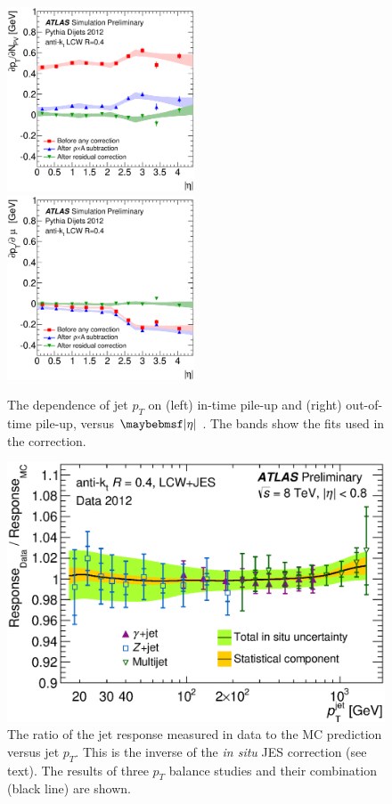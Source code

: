 \begin{figure}
	\includegraphics[width=0.495\textwidth]{tex/selection/jet_pu_npv}
	\hfill
	\includegraphics[width=0.495\textwidth]{tex/selection/jet_pu_mu}
	\caption{The dependence of jet $p_T$ on (left) in-time pile-up and (right) 
	out-of-time pile-up, versus $\mods{\eta}$ \cite{Jets:PileupCorrection:2012}. The 
	bands show the fits used in the correction.}
	\label{fig:objects:jet_pu_corr}
\end{figure}

\begin{figure}
	\includegraphics[width=\mediumfigwidth]{tex/selection/jet_insitu_corr}
	\caption{The ratio of the jet response measured in data to the MC prediction versus 
	jet $p_T$. This is the inverse of the \textit{in situ} JES correction (see text). The 
	results of three $p_T$ balance studies and their combination (black line) are shown.}
	\label{fig:objects:jet_insitu}
\end{figure}



